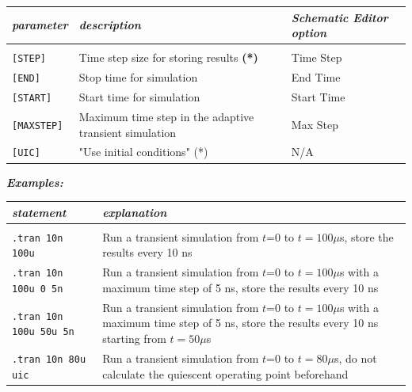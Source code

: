 
\begin{tabular}{lp{5.5cm}p{5cm}}
\textit{parameter} & \textit{description} & \textit{Schematic Editor option}\\ \hline \\ \vspace{-0.8\parskip}
\texttt{[STEP]} & Time step size for {storing results} \textbf{(*)} & \textsf{Time Step}\\
\texttt{[END]} & Stop time for simulation & \textsf{End Time} \\
\texttt{[START]} & Start time for simulation & \textsf{Start Time} \\
\texttt{[MAXSTEP]} & Maximum time step in the adaptive transient simulation & \textsf{Max Step} \\
\texttt{[UIC]} & "Use initial conditions" (*) & \textsf{N/A} 
\end{tabular}


\textbf{\textit{Examples:}}

\begin{tabular}{p{5cm}p{8cm}}
\textit{statement} & \textit{explanation} \\ \hline \\ \vspace{-0.8\parskip} 
\texttt{.tran 10n 100u} & {\small Run a transient simulation from $t$=0 to \newline $t=100\mu$s, store the results every 10 ns} \\
\texttt{.tran 10n 100u 0 5n} & {\small Run a transient simulation from $t$=0 to \newline $t=100\mu$s with a maximum time step of 5 ns, store the results every 10 ns} \\
\texttt{.tran 10n 100u 50u 5n} & {\small Run a transient simulation from $t$=0 to \newline $t=100\mu$s with a maximum time step of 5 ns, store the results every 10 ns \newline starting from $t=50\mu$s} \\
\texttt{.tran 10n 80u uic} & {\small Run a transient simulation from $t$=0 to \newline $t=80\mu$s, do not calculate the quiescent operating point beforehand}
\end{tabular}


